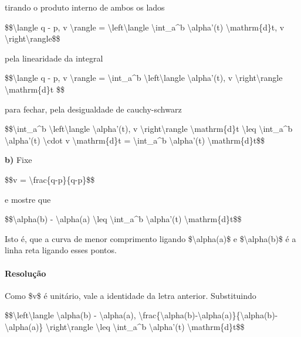 tirando o produto interno de ambos os lados

\$\$\textbackslash{}langle q - p, v \textbackslash{}rangle =
\textbackslash{}left\textbackslash{}langle \textbackslash{}int\_a\^{}b
\textbackslash{}alpha'(t) \textbackslash{}mathrm\{d\}t, v
\textbackslash{}right\textbackslash{}rangle\$\$

pela linearidade da integral

\$\$\textbackslash{}langle q - p, v \textbackslash{}rangle =
\textbackslash{}int\_a\^{}b \textbackslash{}left\textbackslash{}langle
\textbackslash{}alpha'(t), v \textbackslash{}right\textbackslash{}rangle
\textbackslash{}mathrm\{d\}t \$\$

para fechar, pela desigualdade de cauchy-schwarz

\$\$\textbackslash{}int\_a\^{}b
\textbackslash{}left\textbackslash{}langle \textbackslash{}alpha'(t), v
\textbackslash{}right\textbackslash{}rangle \textbackslash{}mathrm\{d\}t
\textbackslash{}leq \textbackslash{}int\_a\^{}b \textbar{}
\textbackslash{}alpha'(t)\textbar{} \textbackslash{}cdot \textbar{} v
\textbar{} \textbackslash{}mathrm\{d\}t = \textbackslash{}int\_a\^{}b
\textbar{} \textbackslash{}alpha'(t)\textbar{}
\textbackslash{}mathrm\{d\}t\$\$

\textbf{b)} Fixe

\$\$v = \textbackslash{}frac\{q-p\}\{\textbar{}q-p\textbar{}\}\$\$

e mostre que

\$\$\textbar{}\textbackslash{}alpha(b) -
\textbackslash{}alpha(a)\textbar{} \textbackslash{}leq
\textbackslash{}int\_a\^{}b
\textbar{}\textbackslash{}alpha'(t)\textbar{}
\textbackslash{}mathrm\{d\}t\$\$

Isto é, que a curva de menor comprimento ligando
\$\textbackslash{}alpha(a)\$ e \$\textbackslash{}alpha(b)\$ é a linha
reta ligando esses pontos.

\hypertarget{resoluuxe7uxe3o-3}{%
\paragraph{Resolução}\label{resoluuxe7uxe3o-3}}

Como \$v\$ é unitário, vale a identidade da letra anterior. Substituindo

\$\$\textbackslash{}left\textbackslash{}langle \textbackslash{}alpha(b)
- \textbackslash{}alpha(a),
\textbackslash{}frac\{\textbackslash{}alpha(b)-\textbackslash{}alpha(a)\}\{\textbar{}\textbackslash{}alpha(b)-\textbackslash{}alpha(a)\textbar{}\}
\textbackslash{}right\textbackslash{}rangle \textbackslash{}leq
\textbackslash{}int\_a\^{}b \textbar{}
\textbackslash{}alpha'(t)\textbar{} \textbackslash{}mathrm\{d\}t\$\$

